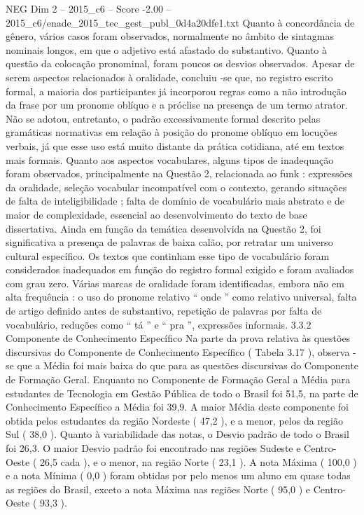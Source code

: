\begin{textsample}{NEG Dim 2 – 2015\_c6 – Score -2.00 – 2015\_c6/enade\_2015\_tec\_gest\_publ\_0d4a20dfe1.txt}
Quanto à concordância de gênero, vários casos foram observados, normalmente no âmbito de sintagmas nominais longos, em que o adjetivo está afastado do substantivo.
Quanto à questão da colocação pronominal, foram poucos os desvios observados.
Apesar de serem aspectos relacionados à oralidade, concluiu -se que, no registro escrito formal, a maioria dos participantes já incorporou regras como a não introdução da frase por um pronome oblíquo e a próclise na presença de um termo atrator.
Não se adotou, entretanto, o padrão excessivamente formal descrito pelas gramáticas normativas em relação à posição do pronome oblíquo em locuções verbais, já que esse uso está muito distante da prática cotidiana, até em textos mais formais.
Quanto aos aspectos vocabulares, alguns tipos de inadequação foram observados, principalmente na Questão 2, relacionada ao funk : expressões da oralidade, seleção vocabular incompatível com o contexto, gerando situações de falta de inteligibilidade ; falta de domínio de vocabulário mais abstrato e de maior de complexidade, essencial ao desenvolvimento do texto de base dissertativa.
Ainda em função da temática desenvolvida na Questão 2, foi significativa a presença de palavras de baixa calão, por retratar um universo cultural específico.
Os textos que continham esse tipo de vocabulário foram considerados inadequados em função do registro formal exigido e foram avaliados com grau zero.
Várias marcas de oralidade foram identificadas, embora não em alta frequência : o uso do pronome relativo “ onde ” como relativo universal, falta de artigo definido antes de substantivo, repetição de palavras por falta de vocabulário, reduções como “ tá ” e “ pra ”, expressões informais. 3.3.2 Componente de Conhecimento Específico Na parte da prova relativa às questões discursivas do Componente de Conhecimento Específico ( Tabela 3.17 ), observa -se que a Média foi mais baixa do que para as questões discursivas do Componente de Formação Geral.
Enquanto no Componente de Formação Geral a Média para estudantes de Tecnologia em Gestão Pública de todo o Brasil foi 51,5, na parte de Conhecimento Específico a Média foi 39,9.
A maior Média deste componente foi obtida pelos estudantes da região Nordeste ( 47,2 ), e a menor, pelos da região Sul ( 38,0 ).
Quanto à variabilidade das notas, o Desvio padrão de todo o Brasil foi 26,3.
O maior Desvio padrão foi encontrado nas regiões Sudeste e Centro-Oeste ( 26,5 cada ), e o menor, na região Norte ( 23,1 ).
A nota Máxima ( 100,0 ) e a nota Mínima ( 0,0 ) foram obtidas por pelo menos um aluno em quase todas as regiões do Brasil, exceto a nota Máxima nas regiões Norte ( 95,0 ) e Centro-Oeste ( 93,3 ).

\end{textsample}
